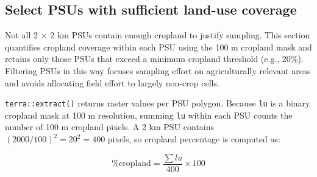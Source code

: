 \documentclass[
  10pt,
  b5paper,
  oneside]{book}
\newenvironment{Shaded}{\begin{snugshade}}{\end{snugshade}}
\newcommand{\AttributeTok}[1]{\textcolor[rgb]{0.13,0.29,0.53}{#1}}
\newcommand{\CommentTok}[1]{\textcolor[rgb]{0.56,0.35,0.01}{\textit{#1}}}
\newcommand{\ConstantTok}[1]{\textcolor[rgb]{0.56,0.35,0.01}{#1}}
\newcommand{\DecValTok}[1]{\textcolor[rgb]{0.00,0.00,0.81}{#1}}
\newcommand{\FunctionTok}[1]{\textcolor[rgb]{0.13,0.29,0.53}{\textbf{#1}}}
\newcommand{\NormalTok}[1]{#1}
\newcommand{\OtherTok}[1]{\textcolor[rgb]{0.56,0.35,0.01}{#1}}
\newcommand{\SpecialCharTok}[1]{\textcolor[rgb]{0.81,0.36,0.00}{\textbf{#1}}}
\newcommand{\StringTok}[1]{\textcolor[rgb]{0.31,0.60,0.02}{#1}}
\begin{document}
\begin{Shaded}
\end{Shaded}

\subsection{Select PSUs with sufficient land-use coverage}\label{select-psus}

Not all 2 × 2 km PSUs contain enough cropland to justify sampling. This section quantifies cropland coverage within each PSU using the 100 m cropland mask and retains only those PSUs that exceed a minimum cropland threshold (e.g., 20\%). Filtering PSUs in this way focuses sampling effort on agriculturally relevant areas and avoids allocating field effort to largely non-crop cells.

\texttt{terra::extract()} returns raster values per PSU polygon. Because \texttt{lu} is a binary cropland mask at 100 m resolution, summing \texttt{lu} within each PSU counts the number of 100 m cropland pixels. A 2 km PSU contains \((2000/100)^2 = 20^2 = 400\) pixels, so cropland percentage is computed as:

\[\% \text{cropland} = \frac{\sum lu}{400} \times 100\]
\end{document}
